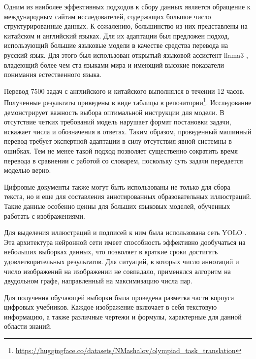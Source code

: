 Одним из наиболее эффективных подходов к сбору данных является обращение к международным сайтам исследователей, содержащих большое число структурированные данных. 
К сожалению, большинство из них представлены на китайском и английский языках. Для их адаптации был
предложен подход, использующий большие языковые модели в качестве средства перевода на русский язык.
Для этого был использован открытый языковой ассистент llama3 \cite{llamatouvron2023}, владеющий более чем ста языками мира и
имеющий высокие показатели понимания естественного языка.

Перевод 7500 задач с английского и китайского выполнялся в течении 12 часов. 
Полученные результаты приведены в виде таблицы в репозитории\footnote{\url{https://huggingface.co/datasets/NMashalov/olympiad_task_translation}}.
Исследование демонстрирует важность выбора оптимальной инструкции для модели. В отсутствие четких требований модель
нарушает формат постановки задачи, искажает числа и обозначения в ответах. Таким образом, проведенный машинный перевод
требует экспертной адаптации в силу отсутствия явной системны в ошибках. Тем не менее такой подход позволяет 
существенно сократить время перевода в сравнении с работой со словарем, поскольку суть задачи передается моделью верно.  

Цифровые документы также могут быть использованы не только для сбора текста, но и еще для составления аннотированных 
образовательных иллюстраций. Такие данные особенно ценны для больших языковых моделей, обученных работать с изображениями.

Для выделения иллюстраций и подписей к ним была использована сеть YOLO \cite{redmon2016you}.
Эта архитектура нейронной сети имеет способность эффективно дообучаться на небольших выборках данных, 
что позволяет в краткие сроки достигать удовлетворительных результатов. Для ситуаций, в которых число аннотаций и число изображений на
изображении не совпадало, применялся алгоритм на двудольном графе, направленный на максимизацию числа пар.
 
Для получения обучающей выборки была проведена разметка части корпуса цифровых учебников.
Каждое изображение включает в себя текстовую информацию, а также различные чертежи и формулы, характерные для данной области знаний.

